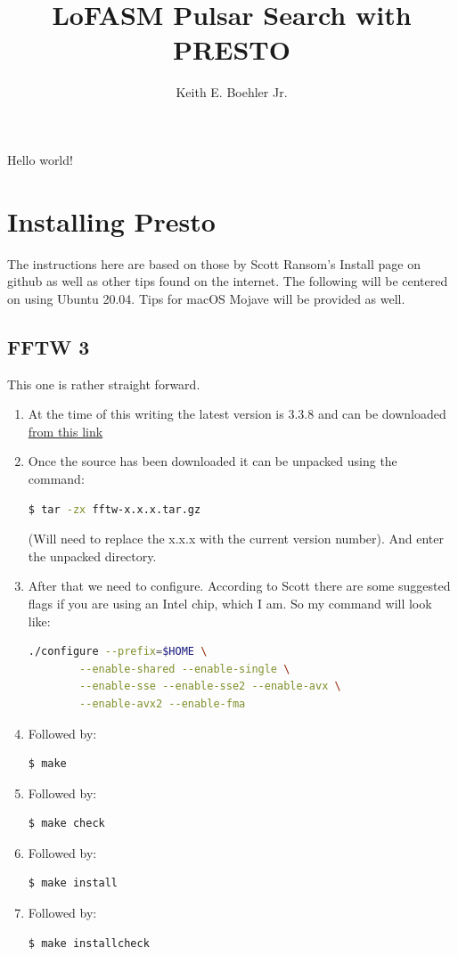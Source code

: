 \documentclass{article}
\title{LoFASM Pulsar Search with PRESTO}
\author{Keith E. Boehler Jr.}
\date{}
\begin{document}
   \maketitle
   Hello world!
   
   \section{Installing Presto}
   The instructions here are based on those by Scott Ransom's Install page on github as well as other 
   tips found on the internet. The following will be centered on using Ubuntu 20.04. Tips for macOS Mojave
   will be provided as well. 
   
   \subsection{FFTW 3}
    This one is rather straight forward. 
    \begin{enumerate}
    	\item At the time of this writing the latest version is 3.3.8 and can be downloaded \href{http://www.fftw.org/download.html}{from this link}
    	\item \noindent Once the source has been downloaded it can be unpacked using the command:
	    \begin{lstlisting}[language=bash]
	    $ tar -zx fftw-x.x.x.tar.gz 
	    \end{lstlisting}
    	(Will need to replace the x.x.x with the current version number). And enter the unpacked directory.
    	\item \noindent After that we need to configure. According to Scott there are some suggested flags if you are
    	using an Intel chip, which I am. So my command will look like: 
	    \begin{lstlisting}[language=bash]
	    ./configure --prefix=$HOME \
	    --enable-shared --enable-single \
	    --enable-sse --enable-sse2 --enable-avx \
	    --enable-avx2 --enable-fma
	    \end{lstlisting}
	    \item \noindent Followed by: \begin{lstlisting}[language=bash]
	    $ make
	    \end{lstlisting}
	    \item \noindent Followed by: 
		\begin{lstlisting}[language=bash]
		$ make check
		\end{lstlisting}
	    \item \noindent Followed by: 
		\begin{lstlisting}[language=bash]
		$ make install
		\end{lstlisting}
	    \item \noindent Followed by:
		\begin{lstlisting}[language=bash]
		 $ make installcheck
		\end{lstlisting}
    	\end{enumerate}
\end{document}
